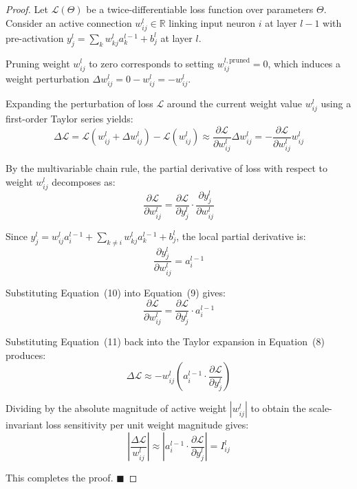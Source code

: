 \begin{proof}
Let $\mathcal{L}(\Theta)$ be a twice-differentiable loss function over parameters $\Theta$. Consider an active connection $w_{ij}^l \in \mathbb{R}$ linking input neuron $i$ at layer $l-1$ with pre-activation $y_j^l = \sum_k w_{kj}^l a_k^{l-1} + b_j^l$ at layer $l$.

Pruning weight $w_{ij}^l$ to zero corresponds to setting $w_{ij}^{l, \text{pruned}} = 0$, which induces a weight perturbation $\Delta w_{ij}^l = 0 - w_{ij}^l = -w_{ij}^l$.

Expanding the perturbation of loss $\mathcal{L}$ around the current weight value $w_{ij}^l$ using a first-order Taylor series yields:
\begin{equation}
\Delta \mathcal{L} = \mathcal{L}(w_{ij}^l + \Delta w_{ij}^l) - \mathcal{L}(w_{ij}^l) \approx \frac{\partial \mathcal{L}}{\partial w_{ij}^l} \Delta w_{ij}^l = -\frac{\partial \mathcal{L}}{\partial w_{ij}^l} w_{ij}^l
\end{equation}

By the multivariable chain rule, the partial derivative of loss with respect to weight $w_{ij}^l$ decomposes as:
\begin{equation}
\frac{\partial \mathcal{L}}{\partial w_{ij}^l} = \frac{\partial \mathcal{L}}{\partial y_j^l} \cdot \frac{\partial y_j^l}{\partial w_{ij}^l}
\end{equation}

Since $y_j^l = w_{ij}^l a_i^{l-1} + \sum_{k \neq i} w_{kj}^l a_k^{l-1} + b_j^l$, the local partial derivative is:
\begin{equation}
\frac{\partial y_j^l}{\partial w_{ij}^l} = a_i^{l-1}
\end{equation}

Substituting Equation~(10) into Equation~(9) gives:
\begin{equation}
\frac{\partial \mathcal{L}}{\partial w_{ij}^l} = \frac{\partial \mathcal{L}}{\partial y_j^l} \cdot a_i^{l-1}
\end{equation}

Substituting Equation~(11) back into the Taylor expansion in Equation~(8) produces:
\begin{equation}
\Delta \mathcal{L} \approx - w_{ij}^l \left( a_i^{l-1} \cdot \frac{\partial \mathcal{L}}{\partial y_j^l} \right)
\end{equation}

Dividing by the absolute magnitude of active weight $|w_{ij}^l|$ to obtain the scale-invariant loss sensitivity per unit weight magnitude gives:
\begin{equation}
\left| \frac{\Delta \mathcal{L}}{w_{ij}^l} \right| \approx \left| a_i^{l-1} \cdot \frac{\partial \mathcal{L}}{\partial y_j^l} \right| = I_{ij}^l
\end{equation}

This completes the proof. $\blacksquare$
\end{proof}

